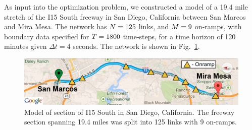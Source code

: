 As input into the optimization problem, we constructed a model of
a 19.4 mile stretch of the I15 South freeway in San Diego,
California between San Marcos and Mira Mesa. The network has $N=125$ links, and $M=9$ on-ramps,
with boundary data specified for $T=1800$ time-steps,
for a time horizon of 120 minutes given $\Delta t=$4 seconds.
The network is shown in Fig.~\ref{fig:Model-of-section}.
\begin{figure}
\centering%
\includegraphics[width=0.65\columnwidth]{previous-articles/adjoint/images/map}%
\caption{Model of section of I15 South in San Diego, California. The freeway section spanning 19.4 miles was split into 125 links with 9 on-ramps.}%
\label{fig:Model-of-section}
\end{figure}


